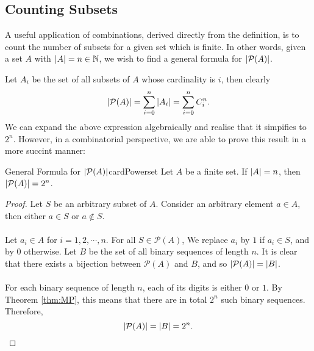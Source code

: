 \documentclass[math]{amznotes}
\theoremstyle{remark}
\begin{document}
\subsection{Counting Subsets}
A useful application of combinations, derived directly from the definition, is to count the number of subsets for a given set which is finite. In other words, given a set $A$ with ${\left\lvert {A} \right\rvert} = n \in \mathbb{N}$, we wish to find a general formula for ${\left\lvert {\mathcal{P}(A)} \right\rvert}$.

Let $A_i$ be the set of all subsets of $A$ whose cardinality is $i$, then clearly
\begin{equation*}
    {\left\lvert {\mathcal{P}(A)} \right\rvert} = \sum_{i = 0}^{n}{\left\lvert {A_i} \right\rvert} = \sum_{i = 0}^{n}C^n_i.
\end{equation*}
We can expand the above expression algebraically and realise that it simpifies to $2^n$. However, in a combinatorial perspective, we are able to prove this result in a more succint manner:
\begin{thmbox}{General Formula for ${\left\lvert {\mathcal{P}(A)} \right\rvert}$}{cardPowerset}
    Let $A$ be a finite set. If ${\left\lvert {A} \right\rvert} = n$, then ${\left\lvert {\mathcal{P}(A)} \right\rvert} = 2^n$.
    \tcblower
    \begin{proof}
        Let $S$ be an arbitrary subset of $A$. Consider an arbitrary element $a \in A$, then either $a \in S$ or $a \notin S$. 
        \\\\
        Let $a_i \in A$ for $i = 1, 2, \cdots, n$. For all $S \in \mathcal{P}(A)$, We replace $a_i$ by $1$ if $a_i \in S$, and by $0$ otherwise. Let $B$ be the set of all binary sequences of length $n$. It is clear that there exists a bijection between $\mathcal{P}(A)$ and $B$, and so ${\left\lvert {\mathcal{P}(A)} \right\rvert} = {\left\lvert {B} \right\rvert}$.
        \\\\
        For each binary sequence of length $n$, each of its digits is either $0$ or $1$. By Theorem \ref{thm:MP}, this means that there are in total $2^n$ such binary sequences. Therefore,
        \begin{equation*}
            {\left\lvert {\mathcal{P}(A)} \right\rvert} = {\left\lvert {B} \right\rvert} = 2^n.
        \end{equation*}
    \end{proof}
\end{thmbox}
\end{document}
